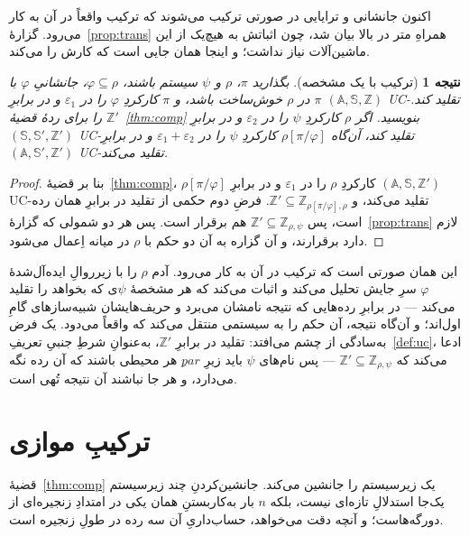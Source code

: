 \documentclass[10pt,oneside,openany]{book}
\newcommand{\pars}{\mathit{par}}
\newcommand{\Aset}{\mathbb{A}}
\newcommand{\SimSet}{\mathbb{S}}
\newcommand{\ZenvSet}{\mathbb{Z}}
\theoremstyle{accentdef}
\theoremstyle{accentplain}
\newtheorem{corollary}[definition]{نتیجه}
\begin{document}
اکنون جانشانی و ترایایی در صورتی ترکیب می‌شوند که ترکیب واقعاً در آن به
کار می‌رود. گزارهٔ~\ref{prop:trans} همراهِ متر در بالا بیان شد، چون
اثباتش به هیچ‌یک از این ماشین‌آلات نیاز نداشت؛ و اینجا همان جایی است که
کارش را می‌کند.

\begin{corollary}[ترکیب با یک مشخصه]\label{cor:comp}
بگذارید $\pi$، $\rho$ و $\psi$ سیستم باشند، $\varphi \subseteq \rho$،
جانشانیِ $\varphi$ با $\pi$ در $\rho$ خوش‌ساخت باشد، و $\pi$ کارکردِ
$\varphi$ را در $\varepsilon_1$ و در برابرِ $(\Aset,\SimSet,\ZenvSet)$
UC-تقلید کند. $\ZenvSet'$ را برای ردهٔ قضیهٔ~\ref{thm:comp} بنویسید. اگر
$\rho$ کارکردِ $\psi$ را در $\varepsilon_2$ و در برابرِ
$(\SimSet,\SimSet',\ZenvSet')$ UC-تقلید کند، آن‌گاه $\rho[\pi/\varphi]$
کارکردِ $\psi$ را در $\varepsilon_1 + \varepsilon_2$ و در برابرِ
$(\Aset,\SimSet',\ZenvSet')$ UC-تقلید می‌کند.
\end{corollary}

\begin{proof}
بنا بر قضیهٔ~\ref{thm:comp}، $\rho[\pi/\varphi]$ کارکردِ $\rho$ را در
$\varepsilon_1$ و در برابرِ $(\Aset,\SimSet,\ZenvSet')$ UC-تقلید می‌کند، و
$\ZenvSet' \subseteq \ZenvSet_{\rho[\pi/\varphi],\rho}$. فرضِ دوم حکمی از
تقلید در برابرِ همان رده است، پس $\ZenvSet' \subseteq \ZenvSet_{\rho,\psi}$
هم برقرار است. پس هر دو شمولی که گزارهٔ~\ref{prop:trans} لازم دارد
برقرارند، و آن گزاره به آن دو حکم با $\rho$ در میانه اِعمال می‌شود.
\end{proof}

این همان صورتی است که ترکیب در آن به کار می‌رود. آدم $\rho$ را با
زیرروالِ ایده‌آل‌شدهٔ $\varphi$ سرِ جایش تحلیل می‌کند و اثبات می‌کند که هر
مشخصهٔ $\psi$ی که بخواهد را تقلید می‌کند --- در برابرِ رده‌هایی که نتیجه
نامشان می‌برد و حریف‌هایشان شبیه‌سازهای گامِ اول‌اند؛ و آن‌گاه نتیجه، آن
حکم را به سیستمی منتقل می‌کند که واقعاً می‌دود. یک فرض به‌سادگی از چشم
می‌افتد: تقلید در برابرِ $\ZenvSet'$، به‌عنوانِ شرطِ جنبیِ
تعریفِ~\ref{def:uc}، ادعا می‌کند که $\ZenvSet' \subseteq
\ZenvSet_{\rho,\psi}$ --- پس نام‌های $\psi$ باید زیرِ $\pars$ِ هر محیطی
باشند که آن رده نگه می‌دارد، و هر جا نباشند آن نتیجه تُهی است.

\section{ترکیبِ موازی}\label{app:parallel}

قضیهٔ~\ref{thm:comp} یک زیرسیستم را جانشین می‌کند. جانشین‌کردنِ چند
زیرسیستم یک‌جا استدلالِ تازه‌ای نیست، بلکه $n$ بار به‌کاربستنِ همان یکی در
امتدادِ زنجیره‌ای از دورگه‌هاست؛ و آنچه دقت می‌خواهد، حساب‌داریِ آن سه رده
در طولِ زنجیره است.
\end{document}
